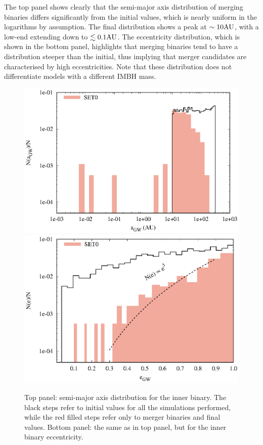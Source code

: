 \documentclass[twocolumn]{aastex62}
\newcommand{\au}{{\rm AU}}
\begin{document}
The top panel shows clearly that the semi-major axis distribution of merging binaries differs significantly from the initial values, which is nearly uniform in the logarithms by assumption. The final distribution shows a peak at $\sim 10\au$, with a low-end extending down to $\lesssim 0.1 \au$. The eccentricity distribution, which is shown in the bottom panel, highlights that merging binaries tend to have a distribution steeper than the initial, thus implying that merger candidates are characterised by high eccentricities. Note that these distribution does not differentiate models with a different IMBH mass. 

\begin{figure}
\centering
\includegraphics[width=\columnwidth]{semiaxis}\\
\includegraphics[width=\columnwidth]{ecce}
\caption{Top panel: semi-major axis distribution for the inner binary. The black steps refer to initial values for all the simulations performed, while the red filled steps refer only to merger binaries and final values. Bottom panel: the same as in top panel, but for the inner binary eccentricity.}
\label{fig:f4}
\end{figure}
\end{document}
